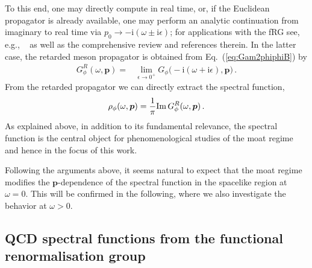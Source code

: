 \documentclass[reprint,english,superscriptaddress,preprintnumbers,amsmath,amssymb,aps,prd,nofootinbib]{revtex4-2}
\newcommand{\bs}[1]{\boldsymbol{#1}}
\def\Eq#1{Eq.~(\ref{#1})}
\begin{document}
To this end, one may directly compute in real time, or, if the Euclidean propagator is already available, one may perform an analytic continuation from imaginary to real time via $p_0\to -\mathrm{i}(\omega\pm\mathrm{i}\epsilon)$; for applications with the fRG see, e.g., 
~\cite{Gasenzer:2007za, Gasenzer:2010rq, Floerchinger:2011sc, Strodthoff:2011tz, Kamikado:2013sia, Tripolt:2013jra, Pawlowski:2015mia, Yokota:2016tip, Kamikado:2016chk, Jung:2016yxl, Pawlowski:2017gxj, Yokota:2017uzu, Wang:2017vis, Tripolt:2018jre, Tripolt:2018qvi, Corell:2019jxh, Huelsmann:2020xcy, Jung:2021ipc, Tan:2021zid, Heller:2021wan, Fehre:2021eob, Roth:2021nrd, Roth:2023wbp, Horak:2023hkp} as well as the comprehensive review \cite{Dupuis:2020fhh} and references therein. In the latter case, the retarded meson propagator is obtained from \Eq{eq:Gam2phiphiB} by
%
\begin{align}
  G^R_\phi(\omega,\bs{p})=&\lim_{\epsilon\to 0^+} G_\phi\big(-\mathrm{i}(\omega+\mathrm{i}\epsilon),\bs{p}\big)\,.
  \label{eq:AnalyContiGamphi2}
\end{align}
%
From the retarded propagator we can directly extract the spectral function,
\begin{align}\label{eq:spec}
    \rho_\phi(\omega,\bs{p}) = \frac{1}{\pi} {\rm Im}\, G_\phi^R(\omega,\bs{p})\,.
\end{align}    
As explained above, in addition to its fundamental relevance, the spectral function is the central object for phenomenological studies of the moat regime and hence in the focus of this work. 

Following the arguments above, it seems natural to expect that the moat regime modifies the $\bs{p}$-dependence of the spectral function in the spacelike region at $\omega = 0$. This will be confirmed in the following, where we also investigate the behavior at $\omega > 0$. 



\subsection{QCD spectral functions from the functional renormalisation group}\label{sec:FRG}
\end{document}
